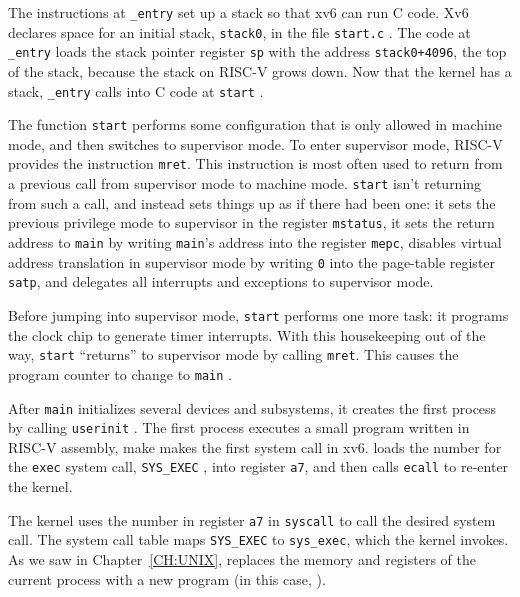 The instructions at
\lstinline{_entry}
set up a stack so that xv6 can run C code.
Xv6 declares space for an initial stack,
\lstinline{stack0},
in the file
\lstinline{start.c}
.
The code at
\lstinline{_entry}
loads the stack pointer register
\texttt{sp}
with the address
\lstinline{stack0+4096},
the top of the stack, because the stack
on RISC-V grows down.
Now that the kernel has a stack,
\lstinline{_entry}
calls into C code at
\lstinline{start}
.

The function
\lstinline{start}
performs some configuration that is only allowed in
machine mode, and then switches to supervisor mode.
To enter supervisor mode, RISC-V
provides the instruction
\lstinline{mret}.
This instruction is most often used to return from
a previous call from supervisor mode to machine mode.
\lstinline{start} isn't returning from such a call, and
instead sets things up as if there had been one:
it sets the previous privilege mode to
supervisor in the register
\lstinline{mstatus},
it sets the return address to
\lstinline{main}
by writing
\lstinline{main}'s
address into
the register
\lstinline{mepc},
disables virtual address translation in supervisor mode
by writing
\lstinline{0}
into the page-table register
\lstinline{satp},
and delegates all interrupts and exceptions
to supervisor mode.

Before jumping into supervisor mode,
\lstinline{start}
performs one more task: it programs the clock
chip to generate timer interrupts.
With this housekeeping out of the way,
\lstinline{start}
``returns'' to supervisor
mode by calling
\lstinline{mret}.
This causes the program counter to change
to
\lstinline{main}
.

After
\lstinline{main}
initializes several devices and subsystems, 
it creates the first process by calling 
\lstinline{userinit}
.
The first process executes a small program written in RISC-V assembly,
make makes the first system call in xv6.
 loads the number for the \lstinline{exec}
system call, \lstinline{SYS_EXEC}
,
into
register {\tt a7},
and then calls \lstinline{ecall} to re-enter the kernel.

The kernel uses the number in register {\tt a7} in \lstinline{syscall}
 to call the desired system call.
The system call table  maps
\lstinline{SYS_EXEC} to \lstinline{sys_exec}, which the kernel
invokes.  As we saw in Chapter~\ref{CH:UNIX}, 
replaces the memory and registers of the current process with a new
program (in this case, ).

